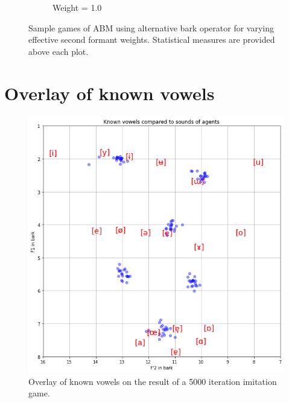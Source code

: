 \begin{figure}[ht]
\begin{subfigure}{.30\textwidth}
        \captionsetup{width=0.9\linewidth}
        \captionsetup{justification=centering}
        \caption{Weight = 1.0}
    \end{subfigure}
    \captionsetup{width=0.9\linewidth}
    \captionsetup{justification=centering}
    \caption{Sample games of ABM using alternative bark operator for varying effective second formant weights. Statistical measures are provided above each plot.}
    \label{fig:bark_weight_impact}
\end{figure}

\clearpage
\section*{Overlay of known vowels}
\begin{figure}[ht]
    \centering
    \includegraphics[width=0.6\linewidth]{images/results/overlayed_known_sounds.png}
    \captionsetup{width=\linewidth}
    \captionsetup{justification=centering}
    \caption{Overlay of known vowels on the result of a 5000 iteration imitation game.}
    \label{fig:overlayed_vowel}
\end{figure}
